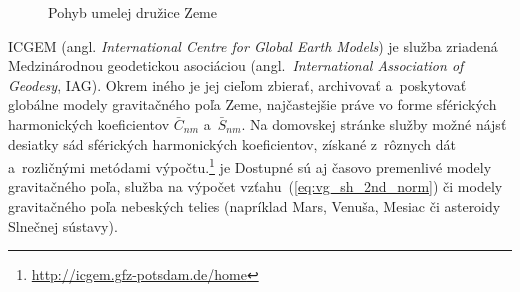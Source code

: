 \documentclass[a4paper,12pt]{book}
\begin{document}
\begin{figure}
\centering

\caption{Pohyb umelej družice Zeme}
\label{fig:orbital_motion_real}
\end{figure}

ICGEM (angl. \emph{International Centre for Global Earth Models}) je služba 
zriadená Medzinárodnou geodetickou asociáciou (angl.~\emph{International 
Association of Geodesy}, IAG).  Okrem iného je jej cieľom zbierať, archivovať 
a~poskytovať globálne modely gravitačného poľa Zeme, najčastejšie práve vo 
forme sférických harmonických koeficientov $\bar{C}_{nm}$ a~$\bar{S}_{nm}$.  Na 
domovskej stránke služby možné nájsť desiatky sád sférických harmonických 
koeficientov, získané z~rôznych dát a~rozličnými metódami 
výpočtu.\footnote{\url{http://icgem.gfz-potsdam.de/home}} je  Dostupné sú aj 
časovo premenlivé modely gravitačného poľa, služba na výpočet 
vzťahu~(\ref{eq:vg_sh_2nd_norm}) či modely gravitačného poľa nebeských telies 
(napríklad Mars, Venuša, Mesiac či asteroidy Slnečnej sústavy).
\end{document}
